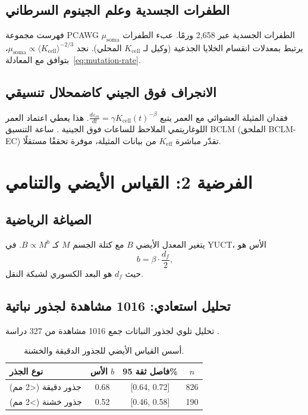 \documentclass[11pt,a4paper]{article}
\begin{document}
	\subsection{الطفرات الجسدية وعلم الجينوم السرطاني}
	
	فهرست مجموعة PCAWG \cite{PCAWG2020} الطفرات الجسدية عبر 2,658 ورمًا. عبء الطفرات \(\mu_{\text{soma}}\) يرتبط بمعدلات انقسام الخلايا الجذعية (وكيل لـ \(K_{\text{cell}}\) المحلي). نجد \(\mu_{\text{soma}} \propto \langle K_{\text{cell}} \rangle^{-2/3}\)، بتوافق مع المعادلة~\eqref{eq:mutation-rate}.
	
	\subsection{الانجراف فوق الجيني كاضمحلال تنسيقي}
	
	فقدان المثيلة العشوائي مع العمر يتبع \(\frac{d\varepsilon_m}{dt} = \gamma K_{\text{cell}}(t)^{-\beta}\). هذا يعطي اعتماد العمر اللوغاريتمي الملاحظ للساعات فوق الجينية \cite{Horvath2013, Lu2023}. ساعة التنسيق BCLM (الملحق BCLM-EC) تقدّر مباشرة \(K_{\text{eff}}\) من بيانات المثيلة، موفرة تحققًا مستقلًا.
	
	\section{الفرضية 2: القياس الأيضي والتنامي}
	
	\subsection{الصياغة الرياضية}
	
	يتغير المعدل الأيضي \(B\) مع كتلة الجسم \(M\) كـ \(B \propto M^{b}\). في YUCT، الأس هو
	\begin{equation}
		b = \beta \cdot \frac{d_f}{2},
		\label{eq:metabolic-scaling}
	\end{equation}
	حيث \(d_f\) هو البعد الكسوري لشبكة النقل.
	
	\subsection{تحليل استعادي: 1016 مشاهدة لجذور نباتية}
	
	تحليل تلوي لجذور النباتات جمع 1016 مشاهدة من 327 دراسة \cite{Yuan2020}.
	
	\begin{table}[H]
		\centering
		\caption{أسس القياس الأيضي للجذور الدقيقة والخشنة.}
		\label{tab:plant-scaling}
		\begin{tabular}{lccc}
			\toprule
			\textbf{نوع الجذر} & \textbf{الأس \(b\)} & \textbf{فاصل ثقة 95\%} & \textbf{\(n\)} \\
			\midrule
			جذور دقيقة (<2 مم) & 0.68 & [0.64, 0.72] & 826 \\
			جذور خشنة (>2 مم) & 0.52 & [0.46, 0.58] & 190 \\
			\bottomrule
		\end{tabular}
	\end{table}
	
\end{document}
